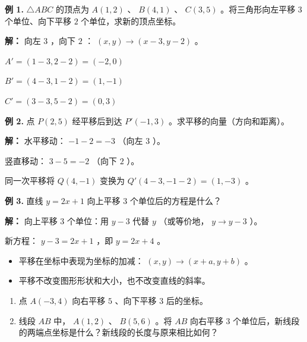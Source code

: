 \begin{workedexamples}


\textbf{例 1.} $\triangle ABC$ 的顶点为 $A(1, 2)$ 、 $B(4, 1)$ 、 $C(3, 5)$ 。将三角形向左平移 $3$ 个单位、向下平移 $2$ 个单位，求新的顶点坐标。

\textbf{解：}
向左 $3$ ，向下 $2$ ： $(x, y) \to (x - 3, y - 2)$ 。

$A' = (1 - 3, 2 - 2) = (-2, 0)$

$B' = (4 - 3, 1 - 2) = (1, -1)$

$C' = (3 - 3, 5 - 2) = (0, 3)$

\textbf{例 2.} 点 $P(2, 5)$ 经平移后到达 $P'(-1, 3)$ 。求平移的向量（方向和距离）。

\textbf{解：}
水平移动： $-1 - 2 = -3$ （向左 $3$ ）。

竖直移动： $3 - 5 = -2$ （向下 $2$ ）。

同一次平移将 $Q(4, -1)$ 变换为 $Q'(4-3, -1-2) = (1, -3)$ 。

\textbf{例 3.} 直线 $y = 2x + 1$ 向上平移 $3$ 个单位后的方程是什么？

\textbf{解：}
向上平移 $3$ 个单位：用 $y - 3$ 代替 $y$ （或等价地， $y \to y - 3$ ）。

新方程： $y - 3 = 2x + 1$ ，即 $y = 2x + 4$ 。

\end{workedexamples}

\begin{keytakeaway}


\begin{itemize}
  \item 平移在坐标中表现为坐标的加减： $(x, y) \to (x + a, y + b)$ 。
  \item 平移不改变图形形状和大小，也不改变直线的斜率。
\end{itemize}


\end{keytakeaway}

\begin{practice}


\begin{enumerate}
  \item 点 $A(-3, 4)$ 向右平移 $5$ 、向下平移 $3$ 后的坐标。
  \item 线段 $AB$ 中， $A(1, 2)$ 、 $B(5, 6)$ 。将 $AB$ 向右平移 $3$ 个单位后，新线段的两端点坐标是什么？新线段的长度与原来相比如何？
\end{enumerate}


\end{practice}



